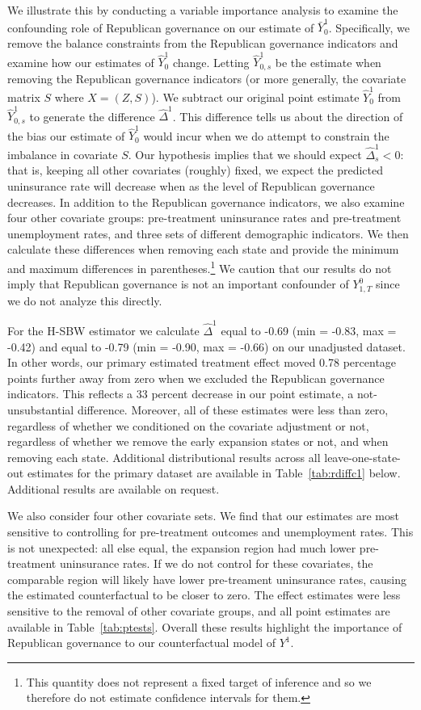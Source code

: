 We illustrate this by conducting a variable importance analysis to examine the confounding role of Republican governance on our estimate of $\bar{Y}_0^1$. Specifically, we remove the balance constraints from the Republican governance indicators and examine how our estimates of $\hat{Y}_0^1$ change. Letting $\hat{Y}^1_{0, s}$ be the estimate when removing the Republican governance indicators (or more generally, the covariate matrix $S$ where $X = (Z, S)$). We subtract our original point estimate $\hat{Y}^1_0$ from $\hat{Y}^1_{0, s}$ to generate the difference $\hat{\Delta}^1$. This difference tells us about the direction of the bias our estimate of $\hat{Y}^1_0$ would incur when we do attempt to constrain the imbalance in covariate $S$. Our hypothesis implies that we should expect $\hat{\Delta}_s^1 < 0$: that is, keeping all other covariates (roughly) fixed, we expect the predicted uninsurance rate will decrease when as the level of Republican governance decreases. In addition to the Republican governance indicators, we also examine four other covariate groups: pre-treatment uninsurance rates and pre-treatment unemployment rates, and three sets of different demographic indicators. We then calculate these differences when removing each state and provide the minimum and maximum differences in parentheses.\footnote{This quantity does not represent a fixed target of inference and so we therefore do not estimate confidence intervals for them.} We caution that our results do not imply that Republican governance is not an important confounder of $Y^0_{1, T}$ since we do not analyze this directly.

For the H-SBW estimator we calculate $\hat{\Delta}^1$ equal to -0.69 (min = -0.83, max = -0.42) and equal to -0.79 (min = -0.90, max = -0.66) on our unadjusted dataset. In other words, our primary estimated treatment effect moved 0.78 percentage points further away from zero when we excluded the Republican governance indicators. This reflects a 33 percent decrease in our point estimate, a not-unsubstantial difference. Moreover, all of these estimates were less than zero, regardless of whether we conditioned on the covariate adjustment or not, regardless of whether we remove the early expansion states or not, and when removing each state. Additional distributional results across all leave-one-state-out estimates for the primary dataset are available in Table~\ref{tab:rdiffc1} below. Additional results are available on request.

We also consider four other covariate sets. We find that our estimates are most sensitive to controlling for pre-treatment outcomes and unemployment rates. This is not unexpected: all else equal, the expansion region had much lower pre-treatment uninsurance rates. If we do not control for these covariates, the comparable region will likely have lower pre-treament uninsurance rates, causing the estimated counterfactual to be closer to zero. The effect estimates were less sensitive to the removal of other covariate groups, and all point estimates are available in Table~\ref{tab:ptests}. Overall these results highlight the importance of Republican governance to our counterfactual model of $Y^1$. 

